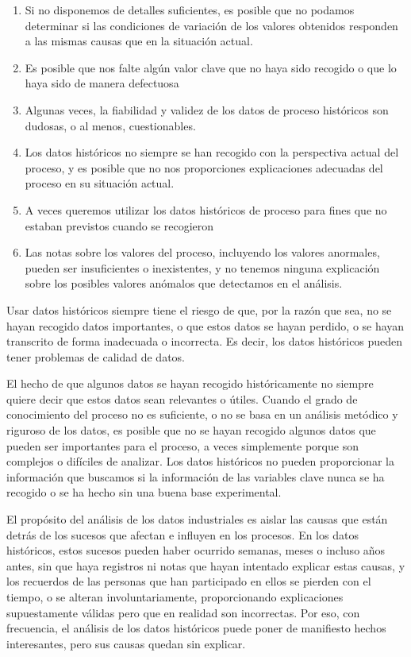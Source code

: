 \documentclass[
  letterpaper,
  DIV=11,
  numbers=noendperiod,
  oneside]{scrreprt}
\providecommand{\tightlist}{%
  \setlength{\itemsep}{0pt}\setlength{\parskip}{0pt}}\usepackage{longtable,booktabs,array}
\begin{document}
\begin{enumerate}
\def\labelenumi{\arabic{enumi}.}
\tightlist
\item
  Si no disponemos de detalles suficientes, es posible que no podamos
  determinar si las condiciones de variación de los valores obtenidos
  responden a las mismas causas que en la situación actual.
\item
  Es posible que nos falte algún valor clave que no haya sido recogido o
  que lo haya sido de manera defectuosa
\item
  Algunas veces, la fiabilidad y validez de los datos de proceso
  históricos son dudosas, o al menos, cuestionables.
\item
  Los datos históricos no siempre se han recogido con la perspectiva
  actual del proceso, y es posible que no nos proporciones explicaciones
  adecuadas del proceso en su situación actual.
\item
  A veces queremos utilizar los datos históricos de proceso para fines
  que no estaban previstos cuando se recogieron
\item
  Las notas sobre los valores del proceso, incluyendo los valores
  anormales, pueden ser insuficientes o inexistentes, y no tenemos
  ninguna explicación sobre los posibles valores anómalos que detectamos
  en el análisis.
\end{enumerate}

Usar datos históricos siempre tiene el riesgo de que, por la razón que
sea, no se hayan recogido datos importantes, o que estos datos se hayan
perdido, o se hayan transcrito de forma inadecuada o incorrecta. Es
decir, los datos históricos pueden tener problemas de calidad de datos.

El hecho de que algunos datos se hayan recogido históricamente no
siempre quiere decir que estos datos sean relevantes o útiles. Cuando el
grado de conocimiento del proceso no es suficiente, o no se basa en un
análisis metódico y riguroso de los datos, es posible que no se hayan
recogido algunos datos que pueden ser importantes para el proceso, a
veces simplemente porque son complejos o difíciles de analizar. Los
datos históricos no pueden proporcionar la información que buscamos si
la información de las variables clave nunca se ha recogido o se ha hecho
sin una buena base experimental.

El propósito del análisis de los datos industriales es aislar las causas
que están detrás de los sucesos que afectan e influyen en los procesos.
En los datos históricos, estos sucesos pueden haber ocurrido semanas,
meses o incluso años antes, sin que haya registros ni notas que hayan
intentado explicar estas causas, y los recuerdos de las personas que han
participado en ellos se pierden con el tiempo, o se alteran
involuntariamente, proporcionando explicaciones supuestamente válidas
pero que en realidad son incorrectas. Por eso, con frecuencia, el
análisis de los datos históricos puede poner de manifiesto hechos
interesantes, pero sus causas quedan sin explicar.
\end{document}
